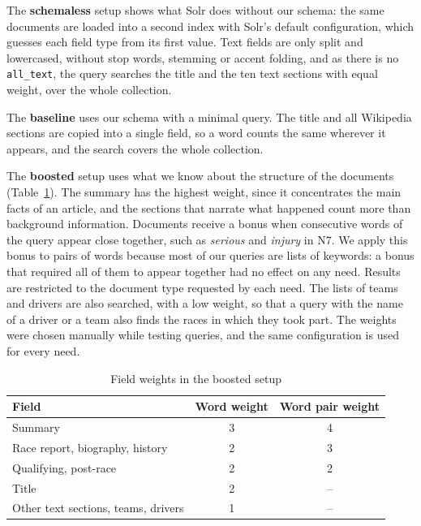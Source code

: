 \documentclass[sigconf]{acmart}
\begin{document}
The \textbf{schemaless} setup shows what Solr does without our schema: the
same documents are loaded into a second index with Solr's default
configuration, which guesses each field type from its first value. Text fields
are only split and lowercased, without stop words, stemming or accent folding,
and as there is no \texttt{all\_text}, the query searches the title and the
ten text sections with equal weight, over the whole collection.

The \textbf{baseline} uses our schema with a minimal query. The title and all
Wikipedia sections are copied into a single field, so a word counts the same
wherever it appears, and the search covers the whole collection.

The \textbf{boosted} setup uses what we know about the structure of the
documents (Table~\ref{tab:weights}). The summary has the highest weight, since
it concentrates the main facts of an article, and the sections that narrate
what happened count more than background information. Documents receive a
bonus when consecutive words of the query appear close together, such as
\textit{serious} and \textit{injury} in N7. We apply this bonus to pairs of
words because most of our queries are lists of keywords: a bonus that required
all of them to appear together had no effect on any need. Results are restricted to
the document type requested by each need. The lists of teams and
drivers are also searched, with a low weight, so that a query with the name
of a driver or a team also finds the races in which they took part. The
weights were chosen manually
while testing queries, and the same configuration is used for every need.

\begin{table}[ht]
  \small
  \begin{tabular}{lcc}
    \toprule
    Field & Word weight & Word pair weight \\
    \midrule
    Summary & 3 & 4 \\
    Race report, biography, history & 2 & 3 \\
    Qualifying, post-race & 2 & 2 \\
    Title & 2 & -- \\
    Other text sections, teams, drivers & 1 & -- \\
    \bottomrule
  \end{tabular}
  \caption{Field weights in the boosted setup}
  \label{tab:weights}
\end{table}
\end{document}
